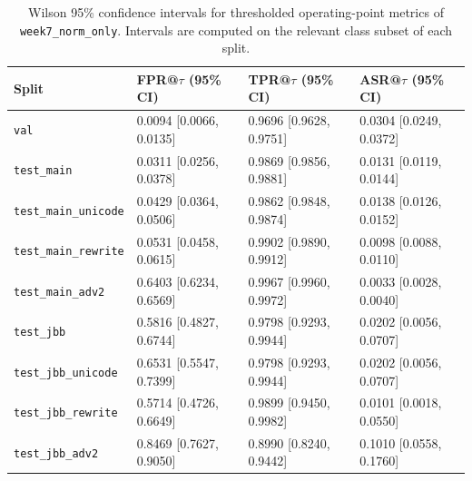 \begin{table}[t]
\centering
\caption{Wilson 95\% confidence intervals for thresholded operating-point metrics of \texttt{week7\_norm\_only}. Intervals are computed on the relevant class subset of each split.}
\label{tab:wilson_ci}
\scriptsize
\begin{tabular}{l p{4.0cm} p{4.0cm} p{4.0cm}}
\toprule
Split & FPR@$\tau$ (95\% CI) & TPR@$\tau$ (95\% CI) & ASR@$\tau$ (95\% CI) \\
\midrule
\texttt{val} & 0.0094 [0.0066, 0.0135] & 0.9696 [0.9628, 0.9751] & 0.0304 [0.0249, 0.0372] \\
\texttt{test\_main} & 0.0311 [0.0256, 0.0378] & 0.9869 [0.9856, 0.9881] & 0.0131 [0.0119, 0.0144] \\
\texttt{test\_main\_unicode} & 0.0429 [0.0364, 0.0506] & 0.9862 [0.9848, 0.9874] & 0.0138 [0.0126, 0.0152] \\
\texttt{test\_main\_rewrite} & 0.0531 [0.0458, 0.0615] & 0.9902 [0.9890, 0.9912] & 0.0098 [0.0088, 0.0110] \\
\texttt{test\_main\_adv2} & 0.6403 [0.6234, 0.6569] & 0.9967 [0.9960, 0.9972] & 0.0033 [0.0028, 0.0040] \\
\texttt{test\_jbb} & 0.5816 [0.4827, 0.6744] & 0.9798 [0.9293, 0.9944] & 0.0202 [0.0056, 0.0707] \\
\texttt{test\_jbb\_unicode} & 0.6531 [0.5547, 0.7399] & 0.9798 [0.9293, 0.9944] & 0.0202 [0.0056, 0.0707] \\
\texttt{test\_jbb\_rewrite} & 0.5714 [0.4726, 0.6649] & 0.9899 [0.9450, 0.9982] & 0.0101 [0.0018, 0.0550] \\
\texttt{test\_jbb\_adv2} & 0.8469 [0.7627, 0.9050] & 0.8990 [0.8240, 0.9442] & 0.1010 [0.0558, 0.1760] \\
\bottomrule
\end{tabular}
\normalsize
\end{table}
